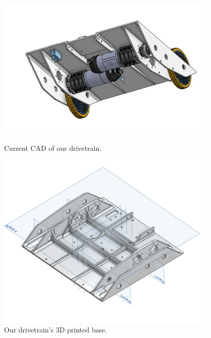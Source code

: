 \begin{figure}[ht]
\centering
\begin{minipage}[b]{.48\textwidth}
  \centering
  \includegraphics[width=0.95\textwidth]{Meetings/October/10-14-21/10-14-21_CAD_Figure1.JPG}
  \caption{Current CAD of our drivetrain.}
  \label{fig:pic2}
\end{minipage}%
\hfill%
\begin{minipage}[b]{.48\textwidth}
  \centering
  \includegraphics[width=0.95\textwidth]{Meetings/October/10-14-21/10-14-21_CAD_Figure2.JPG}
  \caption{Our drivetrain's 3D printed base.}
  \label{fig:pic3}
\end{minipage}
\end{figure}

